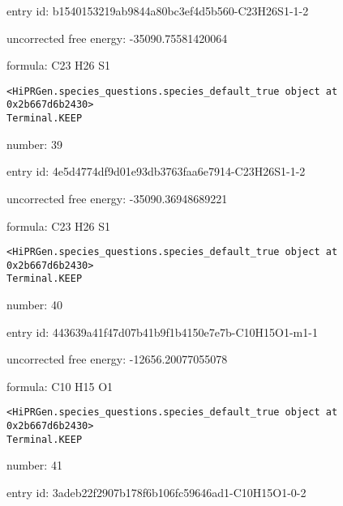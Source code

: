 \documentclass{article}
\begin{document}
entry id: b1540153219ab9844a80bc3ef4d5b560-C23H26S1-1-2



uncorrected free energy: -35090.75581420064



formula: C23 H26 S1


\vspace{1cm}
\begin{verbatim}
<HiPRGen.species_questions.species_default_true object at 0x2b667d6b2430>
Terminal.KEEP
\end{verbatim}


number: 39



entry id: 4e5d4774df9d01e93db3763faa6e7914-C23H26S1-1-2



uncorrected free energy: -35090.36948689221



formula: C23 H26 S1


\vspace{1cm}
\begin{verbatim}
<HiPRGen.species_questions.species_default_true object at 0x2b667d6b2430>
Terminal.KEEP
\end{verbatim}


number: 40



entry id: 443639a41f47d07b41b9f1b4150e7e7b-C10H15O1-m1-1



uncorrected free energy: -12656.20077055078



formula: C10 H15 O1


\vspace{1cm}
\begin{verbatim}
<HiPRGen.species_questions.species_default_true object at 0x2b667d6b2430>
Terminal.KEEP
\end{verbatim}


number: 41



entry id: 3adeb22f2907b178f6b106fc59646ad1-C10H15O1-0-2
\end{document}
